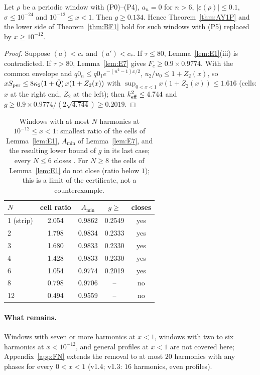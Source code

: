 \begin{theorem} 
\label{thm:E8}
Let $\rho$ be a periodic window with (P0)--(P4), $a_n=0$ for $n>6$, $|\varepsilon(\rho)|\le0.1$, $\sigma\le10^{-24}$ and $10^{-12}\le x<1$. Then
$g\ge0.134$. Hence Theorem~\ref{thm:AY1P} and the lower side of Theorem~\ref{thm:BF1} hold for such windows with (P5) replaced by $x\ge10^{-12}$.
\end{theorem}
\begin{proof}
Suppose $(a)<c_*$ and $(a')<c_*$. If $\tau\le80$, Lemma~\ref{lem:E1}(iii) is contradicted. If $\tau>80$, Lemma~\ref{lem:E7} gives $F_c\ge0.9\times0.9774$. With the
common envelope and $q0_n\le q0_1e^{-(n^2-1)x/2}$, $u_2/u_0\le1+Z_2(x)$, so $xS_{\mathrm{per}}\le8\kappa_2(1+\bar Q)\,x(1+Z_2(x))$ with
$\sup_{0<x<1}x(1+Z_2(x))\le1.616$ (cells: $x$ at the right end, $Z_2$ at the left); then $k_{\mathrm{eff}}^2\le4.744$ and $g\ge0.9\times0.9774/(2\sqrt{4.744})\ge0.2019$.
\end{proof}

\begin{table}
\caption{Windows with at most $N$ harmonics at $10^{-12}\le x<1$: smallest ratio of the cells of Lemma~\ref{lem:E1}, $A_{\min}$ of Lemma~\ref{lem:E7}, and the
resulting lower bound of $g$ in its last case; every $N\le6$ closes . For $N\ge8$ the cells of Lemma~\ref{lem:E1} do not
close (ratio below $1$); this is a limit of the certificate, not a counterexample.}
\label{tab:Nwin}
\begin{ruledtabular}
\begin{tabular}{lcccc}
$N$ & cell ratio & $A_{\min}$ & $g\ge$ & closes\\ \hline
1 (strip) & 2.054 & 0.9862 & 0.2549 & yes\\
2 & 1.798 & 0.9834 & 0.2333 & yes\\
3 & 1.680 & 0.9833 & 0.2330 & yes\\
4 & 1.428 & 0.9833 & 0.2330 & yes\\
6 & 1.054 & 0.9774 & 0.2019 & yes\\
8 & 0.798 & 0.9706 & -- & no\\
12 & 0.494 & 0.9559 & -- & no\\
\end{tabular}
\end{ruledtabular}
\end{table}

\paragraph*{What remains.}
Windows with seven or more harmonics at $x<1$, windows with two to six harmonics at $x<10^{-12}$, and general profiles at $x<1$ are not covered here; Appendix~\ref{app:FN} extends the removal to at most $20$ harmonics with any phases for every $0<x<1$ (v1.4; v1.3: $16$ harmonics, even profiles).
